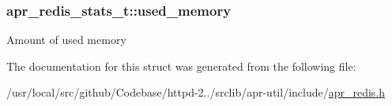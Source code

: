 \subsubsection[{\texorpdfstring{used\+\_\+memory}{used_memory}}]{ apr\+\_\+redis\+\_\+stats\+\_\+t\+::used\+\_\+memory}\hypertarget{structapr__redis__stats__t_a293573a28827bca42095a5feb87bcda0}{}\label{structapr__redis__stats__t_a293573a28827bca42095a5feb87bcda0}
Amount of used memory 

The documentation for this struct was generated from the following file\+:\begin{DoxyCompactItemize}
\item 
/usr/local/src/github/\+Codebase/httpd-\/2../srclib/apr-\/util/include/\hyperlink{apr__redis_8h}{apr\+\_\+redis.\+h}\end{DoxyCompactItemize}
